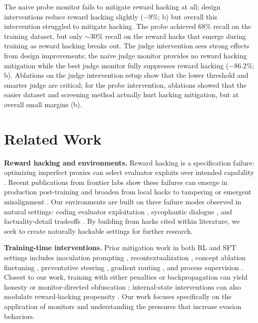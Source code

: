 \documentclass{article}
\begin{document}
The naive probe monitor fails to mitigate reward hacking at all; design interventions reduce reward hacking slightly ($-9\%$; b) but overall this intervention struggled to mitigate hacking. The probe achieved $68\%$ recall on the training dataset, but only $\sim$30\% recall on the reward hacks that emerge during training as reward hacking breaks out. The judge intervention sees strong effects from design improvements; the naive judge monitor provides no reward hacking mitigation while the best judge monitor fully suppresses reward hacking ($-86.2\%$; b). Ablations on the judge intervention setup show that the lower threshold and smarter judge are critical; for the probe intervention, ablations showed that the easier dataset and screening method actually hurt hacking mitigation, but at overall small margins (b). 

\section{Related Work}
\FloatBarrier

\textbf{Reward hacking and environments.} Reward hacking is a specification failure: optimizing imperfect proxies can select evaluator exploits over intended capability \citep{amodei2016concrete, skalse2022defining, pan2022effects}. Recent publications from frontier labs show these failures can emerge in production post-training \citep{openai_goblins_2026, anthropic2026mythos, openai_sycophancy_2025} and broaden from local hacks to tampering or emergent misalignment \citep{denison2024subterfuge, macdiarmid2025natural}. Our environments are built on three failure modes observed in natural settings: coding evaluator exploitation \citep{zhong2025impossiblebench}, sycophantic dialogue \citep{sharma2023sycophancy}, and factuality-detail tradeoffs \citep{min2023factscore, song2024veriscore, prasad2026features}. By building from hacks cited within literature, we seek to create naturally hackable settings for further research.

\textbf{Training-time interventions.} Prior mitigation work in both RL and SFT settings includes inoculation prompting \citep{wichers2025inoculation,tan2025inoculation}, recontextualization \citep{azarbal2025recontextualization}, concept ablation finetuning \citep{casademunt2025steering}, preventative steering \citep{chen2025persona}, gradient routing \citep{cloud2024-gradientrouting}, and process supervision \citep{gasteiger2025alignmentfaking}. Closest to our work, training with either penalties or backpropagation can yield honesty or monitor-directed obfuscation \citep{obfuscationatlas}; internal-state interventions can also modulate reward-hacking propensity \citep{sofroniew2026emotion}. Our work focuses specifically on the application of monitors and understanding the pressures that increase evasion behaviors.
\end{document}
